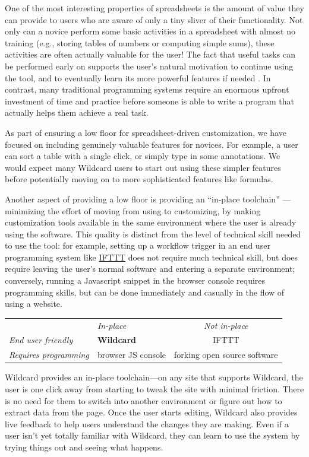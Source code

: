 \documentclass[english,submission]{programming}
\begin{document}
One of the most interesting properties of spreadsheets is the amount of
value they can provide to users who are aware of only a tiny sliver of
their functionality. Not only can a novice perform some basic activities
in a spreadsheet with almost no training (e.g., storing tables of
numbers or computing simple sums), these activities are often actually
valuable for the user! The fact that useful tasks can be performed early
on supports the user's natural motivation to continue using the tool,
and to eventually learn its more powerful features if needed
\autocite{nardi1991}. In contrast, many traditional programming systems
require an enormous upfront investment of time and practice before
someone is able to write a program that actually helps them achieve a
real task.

As part of ensuring a low floor for spreadsheet-driven customization, we
have focused on including genuinely valuable features for novices. For
example, a user can sort a table with a single click, or simply type in
some annotations. We would expect many Wildcard users to start out using
these simpler features before potentially moving on to more
sophisticated features like formulas.

Another aspect of providing a low floor is providing an ``in-place
toolchain'' \autocite{inkandswitch2019}---minimizing the effort of
moving from using to customizing, by making customization tools
available in the same environment where the user is already using the
software. This quality is distinct from the level of technical skill
needed to use the tool: for example, setting up a workflow trigger in an
end user programming system like \href{https://ifttt.com/}{IFTTT} does
not require much technical skill, but does require leaving the user's
normal software and entering a separate environment; conversely, running
a Javascript snippet in the browser console requires programming skills,
but can be done immediately and casually in the flow of using a website.

\begin{longtable}[]{@{}llc@{}}
\toprule
\endhead
& \emph{In-place} & \emph{Not in-place}\tabularnewline
\emph{End user friendly} & \textbf{Wildcard} & IFTTT\tabularnewline
\emph{Requires programming} & browser JS console & forking open source
software\tabularnewline
\bottomrule
\end{longtable}

Wildcard provides an in-place toolchain---on any site that supports
Wildcard, the user is one click away from starting to tweak the site
with minimal friction. There is no need for them to switch into another
environment or figure out how to extract data from the page. Once the
user starts editing, Wildcard also provides live feedback to help users
understand the changes they are making. Even if a user isn't yet totally
familiar with Wildcard, they can learn to use the system by trying
things out and seeing what happens.
\end{document}
